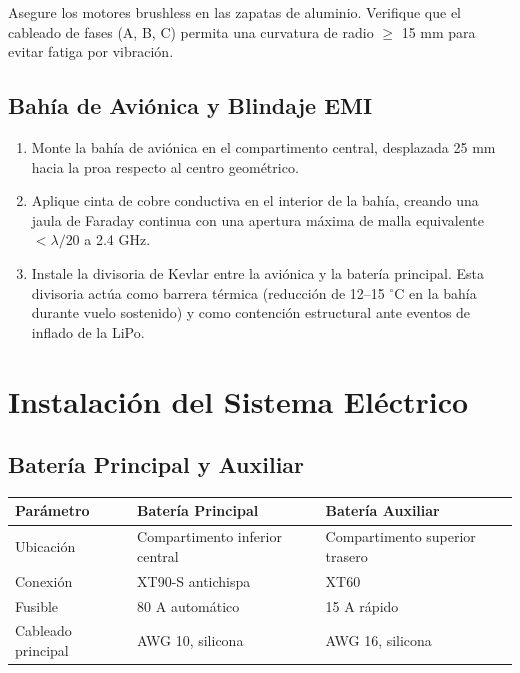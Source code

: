 Asegure los motores brushless en las zapatas de aluminio. Verifique que el cableado de fases (A, B, C) permita una curvatura de radio $\geq$ 15 mm para evitar fatiga por vibración.

\subsection{Bahía de Aviónica y Blindaje EMI}

\begin{enumerate}
    \item Monte la bahía de aviónica en el compartimento central, desplazada 25 mm hacia la proa respecto al centro geométrico.
    \item Aplique cinta de cobre conductiva en el interior de la bahía, creando una jaula de Faraday continua con una apertura máxima de malla equivalente $< \lambda/20$ a 2.4 GHz.
    \item Instale la divisoria de Kevlar entre la aviónica y la batería principal. Esta divisoria actúa como barrera térmica (reducción de 12--15 $^\circ$C en la bahía durante vuelo sostenido) y como contención estructural ante eventos de inflado de la LiPo.
\end{enumerate}

\section{Instalación del Sistema Eléctrico}

\subsection{Batería Principal y Auxiliar}

\begin{table}[h]
\centering
\begin{tabular}{|l|l|l|}
\hline
\textbf{Parámetro} & \textbf{Batería Principal} & \textbf{Batería Auxiliar} \\ \hline
Ubicación & Compartimento inferior central & Compartimento superior trasero \\ \hline
Conexión & XT90-S antichispa & XT60 \\ \hline
Fusible & 80 A automático & 15 A rápido \\ \hline
Cableado principal & AWG 10, silicona & AWG 16, silicona \\ \hline
\end{tabular}
\end{table}

